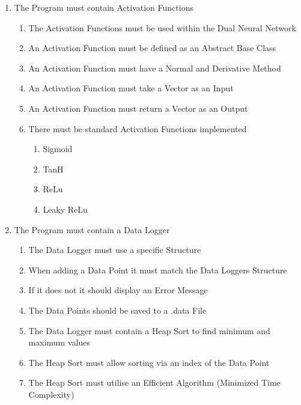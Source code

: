 \begin{flushleft}
\begin{enumerate}
                \item The Program must contain Activation Functions
                \begin{enumerate}
                    \item The Activation Functions must be used within the Dual Neural Network
                    \item An Activation Function must be defined as an Abstract Base Class
                    \item An Activation Function must have a Normal and Derivative Method
                    \item An Activation Function must take a Vector as an Input
                    \item An Activation Function must return a Vector as an Output
                    \item There must be standard Activation Functions implemented
                    \begin{enumerate}
                        \item Sigmoid
                        \item TanH
                        \item ReLu
                        \item Leaky ReLu
                    \end{enumerate}
                \end{enumerate}

                \item The Program must contain a Data Logger
                \begin{enumerate}
                    \item The Data Logger must use a specific Structure
                    \item When adding a Data Point it must match the Data Loggers Structure
                    \item If it does not it should display an Error Message
                    \item The Data Points should be saved to a .data File
                    \item The Data Logger must contain a Heap Sort to find minimum and maximum values
                    \item The Heap Sort must allow sorting via an index of the Data Point
                    \item The Heap Sort must utilise an Efficient Algorithm (Minimized Time Complexity)
                \end{enumerate}


\end{enumerate}
\end{flushleft}
